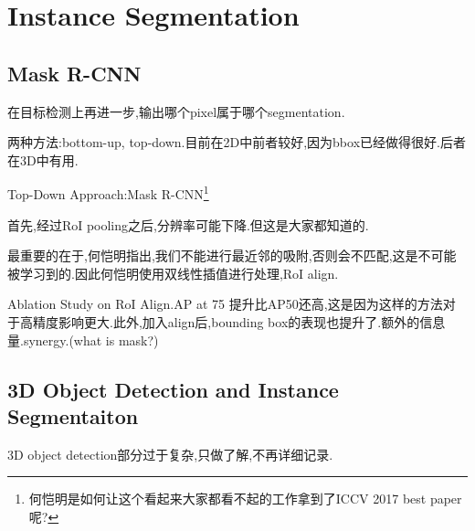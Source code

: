 \section{Instance Segmentation}
	
\subsection{Mask R-CNN}

	在目标检测上再进一步,输出哪个pixel属于哪个segmentation.
	
	两种方法:bottom-up, top-down.目前在2D中前者较好,因为bbox已经做得很好.后者在3D中有用.
	
	Top-Down Approach:Mask R-CNN\footnote{何恺明是如何让这个看起来大家都看不起的工作拿到了ICCV 2017 best paper呢?}
	
	首先,经过RoI pooling之后,分辨率可能下降.但这是大家都知道的.
	
	最重要的在于,何恺明指出,我们不能进行最近邻的吸附,否则会不匹配,这是不可能被学习到的.因此何恺明使用双线性插值进行处理,RoI align.
	
	Ablation Study on RoI Align.AP at 75 提升比AP50还高,这是因为这样的方法对于高精度影响更大.此外,加入align后,bounding box的表现也提升了.额外的信息量.synergy.(what is mask?)
	
\subsection{3D Object Detection and Instance Segmentaiton}

	3D object detection部分过于复杂,只做了解,不再详细记录.
	